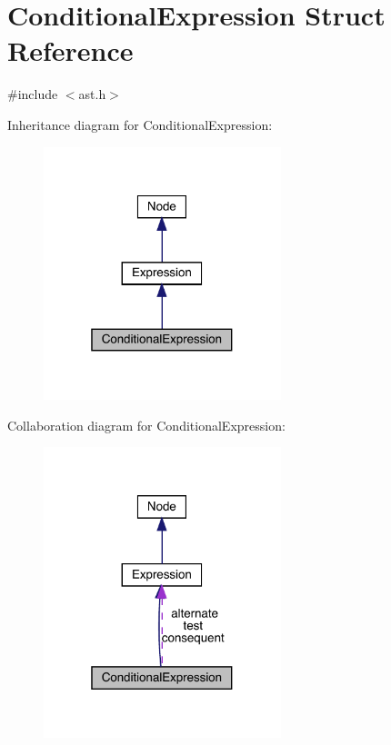 \hypertarget{struct_conditional_expression}{}\section{Conditional\+Expression Struct Reference}
\label{struct_conditional_expression}


{\ttfamily \#include $<$ast.\+h$>$}



Inheritance diagram for Conditional\+Expression\+:
\nopagebreak
\begin{figure}[H]
\begin{center}
\leavevmode
\includegraphics[width=196pt]{struct_conditional_expression__inherit__graph}
\end{center}
\end{figure}


Collaboration diagram for Conditional\+Expression\+:
\nopagebreak
\begin{figure}[H]
\begin{center}
\leavevmode
\includegraphics[width=196pt]{struct_conditional_expression__coll__graph}
\end{center}
\end{figure}
